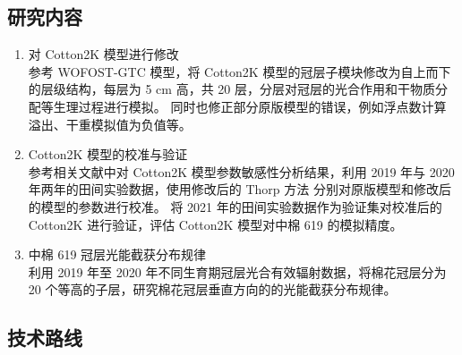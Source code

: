\subsection{研究内容}
\begin{enumerate}
    \item 对 Cotton2K 模型进行修改\\%
          参考 WOFOST-GTC 模型，将 Cotton2K 模型的冠层子模块修改为自上而下的层级结构，每层为 5 cm 高，共 20 层，分层对冠层的光合作用和干物质分配等生理过程进行模拟。%
          同时也修正部分原版模型的错误，例如浮点数计算溢出、干重模拟值为负值等。
    \item Cotton2K 模型的校准与验证\\%
          参考相关文献中对 Cotton2K 模型参数敏感性分析结果，利用 2019 年与 2020 年两年的田间实验数据，使用修改后的 Thorp 方法\cite{thorp2019} 分别对原版模型和修改后的模型的参数进行校准。%
          将 2021 年的田间实验数据作为验证集对校准后的 Cotton2K 进行验证，评估 Cotton2K 模型对中棉 619 的模拟精度。
    \item 中棉 619 冠层光能截获分布规律\\%
          利用 2019 年至 2020 年不同生育期冠层光合有效辐射数据，将棉花冠层分为 20 个等高的子层，研究棉花冠层垂直方向的的光能截获分布规律。
\end{enumerate}

\subsection{技术路线}

